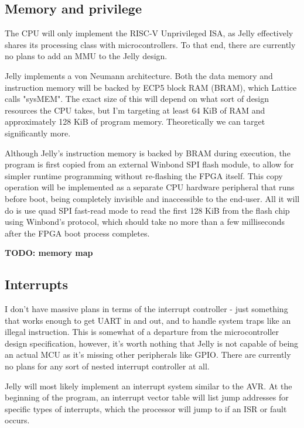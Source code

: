 \documentclass{article}
\begin{document}

\subsection{Memory and privilege}
The CPU will only implement the RISC-V Unprivileged ISA, as Jelly effectively shares its processing class
with microcontrollers. To that end, there are currently no plans to add an MMU to the Jelly design.

Jelly implements a von Neumann architecture. Both the data memory and instruction memory will be backed by
ECP5 block RAM (BRAM), which Lattice calls "sysMEM". The exact size of this will depend on what sort of
design resources the CPU takes, but I'm targeting at least 64 KiB of RAM and approximately 128 KiB of program
memory. Theoretically we can target significantly more.

Although Jelly's instruction memory is backed by BRAM during execution, the program is first copied from an
external Winbond SPI flash module, to allow for simpler runtime programming without re-flashing the FPGA
itself. This copy operation will be implemented as a separate CPU hardware peripheral that runs before boot,
being completely invisible and inaccessible to the end-user. All it will do is use quad SPI fast-read mode to
read the first 128 KiB from the flash chip using Winbond's protocol, which should take no more than a few
milliseconds after the FPGA boot process completes.

\textbf{TODO: memory map}

\subsection{Interrupts}
I don't have massive plans in terms of the interrupt controller - just something that works enough to get
UART in and out, and to handle system traps like an illegal instruction. This is somewhat of a departure from
the microcontroller design specification, however, it's worth nothing that Jelly is not capable of being an
actual MCU as it's missing other peripherals like GPIO. There are currently no plans for any sort of nested
interrupt controller at all.

Jelly will most likely implement an interrupt system similar to the AVR. At the beginning of the program, an
interrupt vector table will list jump addresses for specific types of interrupts, which the processor will
jump to if an ISR or fault occurs.
\end{document}
